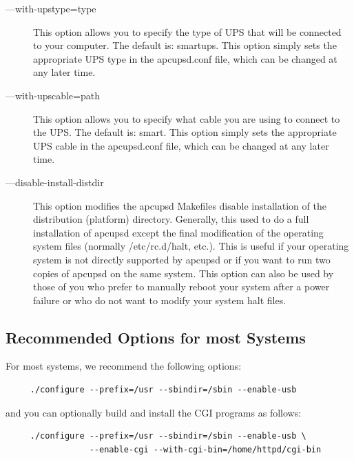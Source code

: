 \begin{description}
\item [{---}with-upstype=\lt{}type\gt{}]
   This option allows you to specify the type of UPS that will be connected to
your computer. The default is: smartups. This option simply sets the
appropriate UPS type in the apcupsd.conf file, which can be changed at any
later time.  

\item [{---}with-upscable=\lt{}path\gt{}]
   This option allows you to specify what cable you are using to connect to the
UPS. The default is: smart. This option simply sets the appropriate UPS cable
in the apcupsd.conf file, which can be changed at any later time.  

\item [{---}disable-install-distdir]
   This option modifies the apcupsd Makefiles disable installation of the
distribution (platform) directory. Generally, this used to do a full
installation of apcupsd except the final modification of the operating system
files (normally /etc/rc.d/halt, etc.). This is useful if your operating system
is not directly supported by apcupsd or if you want to run two copies of
apcupsd on the same system. This option can also be used by those of you who
prefer to manually reboot your system after a power failure or who do not want
to modify your system halt files. 
\end{description}

\label{Recommended-Options-for-most-Systems}

\subsection*{Recommended Options for most Systems}

For most systems, we recommend the following options: 

\footnotesize
\begin{verbatim}
     ./configure --prefix=/usr --sbindir=/sbin --enable-usb
\end{verbatim}
\normalsize

and you can optionally build and install the CGI programs as follows: 

\footnotesize
\begin{verbatim}
     ./configure --prefix=/usr --sbindir=/sbin --enable-usb \
                 --enable-cgi --with-cgi-bin=/home/httpd/cgi-bin
\end{verbatim}
\normalsize

